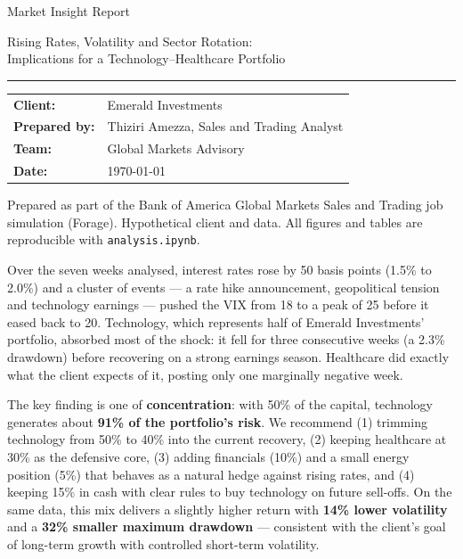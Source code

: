 \documentclass[11pt]{article}
\begin{document}
\begin{titlepage}
  \vspace*{4cm}
  {\color{navy}\fontsize{30}{36}\selectfont Market Insight Report}\par\medskip
  {\Large Rising Rates, Volatility and Sector Rotation:\\
  Implications for a Technology--Healthcare Portfolio}\par
  {\color{rulegray}\rule{\linewidth}{0.6pt}}\par\bigskip
  \begin{tabular}{@{}ll}
    \textbf{Client:}      & Emerald Investments \\
    \textbf{Prepared by:} & Thiziri Amezza, Sales and Trading Analyst \\
    \textbf{Team:}        & Global Markets Advisory \\
    \textbf{Date:}        & \today \\
  \end{tabular}
  \vfill
  {\small\color{gray}Prepared as part of the Bank of America Global Markets
  Sales and Trading job simulation (Forage). Hypothetical client and data.
  All figures and tables are reproducible with \texttt{analysis.ipynb}.}
\end{titlepage}

Over the seven weeks analysed, interest rates rose by 50 basis points (1.5\%
to 2.0\%) and a cluster of events --- a rate hike announcement, geopolitical
tension and technology earnings --- pushed the VIX from 18 to a peak of 25
before it eased back to 20. Technology, which represents half of Emerald
Investments' portfolio, absorbed most of the shock: it fell for three
consecutive weeks (a 2.3\% drawdown) before recovering on a strong earnings
season. Healthcare did exactly what the client expects of it, posting only one
marginally negative week.

The key finding is one of \textbf{concentration}: with 50\% of the capital,
technology generates about \textbf{91\% of the portfolio's risk}. We recommend
(1) trimming technology from 50\% to 40\% into the current recovery,
(2) keeping healthcare at 30\% as the defensive core, (3) adding financials
(10\%) and a small energy position (5\%) that behaves as a natural hedge against
rising rates, and (4) keeping 15\% in cash with clear rules to buy technology
on future sell-offs. On the same data, this mix delivers a slightly higher
return with \textbf{14\% lower volatility} and a \textbf{32\% smaller maximum
drawdown} --- consistent with the client's goal of long-term growth with
controlled short-term volatility.
\end{document}
